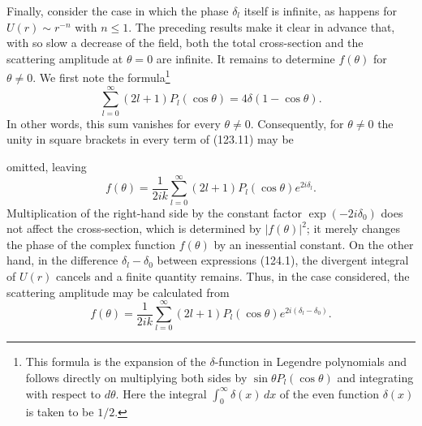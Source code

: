 Finally, consider the case in which the phase $\delta_l$ itself is infinite,
as happens for $U(r)\sim r^{-n}$ with $n\leqslant1$.  The preceding results
make it clear in advance that, with so slow a decrease of the field, both the
total cross-section and the scattering amplitude at $\theta=0$ are infinite.
It remains to determine $f(\theta)$ for $\theta\ne0$.  We first note the
formula\footnote{This formula is the expansion of the $\delta$-function in
Legendre polynomials and follows directly on multiplying both sides by
$\sin\theta P_l(\cos\theta)$ and integrating with respect to $d\theta$.  Here
the integral $\int_0^\infty\delta(x)\,dx$ of the even function $\delta(x)$ is
taken to be $1/2$.}
\begin{equation}
 \sum_{l=0}^{\infty}(2l+1)P_l(\cos\theta)=4\delta(1-\cos\theta).
 \tag{124.3}
\end{equation}
In other words, this sum vanishes for every $\theta\ne0$.  Consequently, for
$\theta\ne0$ the unity in square brackets in every term of (123.11) may be

omitted, leaving
\begin{equation}
 f(\theta)=\frac1{2ik}\sum_{l=0}^{\infty}(2l+1)
 P_l(\cos\theta)e^{2i\delta_l}.
 \tag{124.4}
\end{equation}
Multiplication of the right-hand side by the constant factor
$\exp(-2i\delta_0)$ does not affect the cross-section, which is determined by
$|f(\theta)|^2$; it merely changes the phase of the complex function
$f(\theta)$ by an inessential constant.  On the other hand, in the difference
$\delta_l-\delta_0$ between expressions (124.1), the divergent integral of
$U(r)$ cancels and a finite quantity remains.  Thus, in the case considered,
the scattering amplitude may be calculated from
\begin{equation}
 f(\theta)=\frac1{2ik}\sum_{l=0}^{\infty}(2l+1)
 P_l(\cos\theta)e^{2i(\delta_l-\delta_0)}.
 \tag{124.5}
\end{equation}
